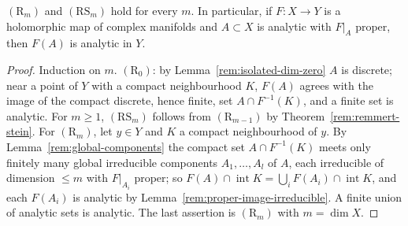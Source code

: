 \begin{theorem}
\label{rem:proper-mapping}
\leanok
\((\mathrm R_m)\) and \((\mathrm{RS}_m)\) hold for every \(m\). In particular, if \(F\colon X\to Y\) is a holomorphic map of complex manifolds and \(A\subset X\) is
analytic with \(F|_A\) proper, then \(F(A)\) is analytic in \(Y\).
\end{theorem}
\begin{proof}
\leanok
Induction on \(m\). \((\mathrm R_0)\): by Lemma~\ref{rem:isolated-dim-zero} \(A\) is discrete; near a point of \(Y\) with a compact neighbourhood \(K\),
\(F(A)\) agrees with the image of the compact discrete, hence finite, set \(A\cap F^{-1}(K)\), and a finite set is analytic. For \(m\ge1\), \((\mathrm{RS}_m)\)
follows from \((\mathrm R_{m-1})\) by Theorem~\ref{rem:remmert-stein}. For \((\mathrm R_m)\), let \(y\in Y\) and \(K\) a compact neighbourhood of \(y\). By
Lemma~\ref{rem:global-components} the compact set \(A\cap F^{-1}(K)\) meets only finitely many global irreducible components \(A_1,\dots,A_l\) of \(A\), each
irreducible of dimension \(\le m\) with \(F|_{A_i}\) proper; so \(F(A)\cap\operatorname{int}K=\bigcup_iF(A_i)\cap\operatorname{int}K\), and each \(F(A_i)\) is analytic
by Lemma~\ref{rem:proper-image-irreducible}. A finite union of analytic sets is analytic. The last assertion is \((\mathrm R_m)\) with \(m=\dim X\).
\end{proof}
